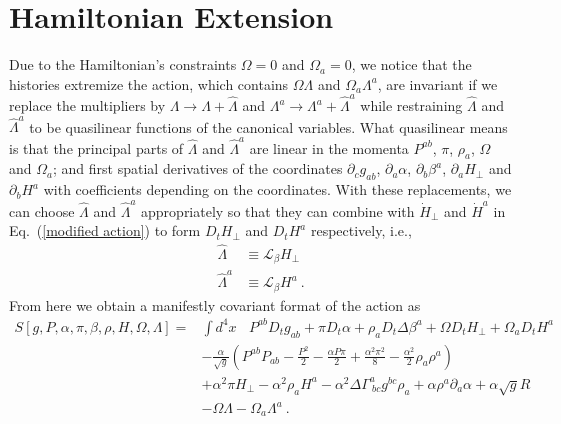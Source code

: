 \section{Hamiltonian Extension}\label{extension}
Due to the Hamiltonian's constraints $\Omega = 0$ and $\Omega_{a} = 0$, we notice that the histories extremize the action, which contains $\Omega \Lambda$ and $\Omega_{a}\Lambda^{a}$, are invariant if we replace the multipliers by $\Lambda \rightarrow \Lambda + {\hat \Lambda}$ and $\Lambda^{a} \rightarrow \Lambda^{a} + {\hat \Lambda}^{a}$ while restraining ${\hat \Lambda}$ and ${\hat \Lambda}^{a}$ to be quasilinear functions of the canonical variables. What quasilinear means is that the principal parts of ${\hat \Lambda}$ and ${\hat \Lambda}^{a}$ are linear in the momenta $P^{ab}$, $\pi$, $\rho_{a}$, $\Omega$ and $\Omega_{a}$; and first spatial derivatives of the coordinates $\partial_{c}g_{ab}$, $\partial_{a}\alpha$, $\partial_{b}\beta^{a}$, $\partial_{a}H_{\perp}$ and $\partial_{b}H^{a}$ with coefficients depending on the coordinates. With these replacements, we can choose ${\hat \Lambda}$ and ${\hat \Lambda}^{a}$ appropriately so that they can combine with ${\dot H}_{\perp}$ and ${\dot H}^{a}$ in Eq.~(\ref{modified action}) to form $D_{t}H_{\perp}$ and $D_{t}H^{a}$ respectively, i.e., 
\begin{subequations}
\begin{align}
{\hat \Lambda} & \equiv \mathcal{L}_{\beta}H_{\perp}\\
{\hat \Lambda}^{a} & \equiv \mathcal{L}_{\beta}H^{a} \ .
\end{align}
\end{subequations}
From here we obtain a manifestly covariant format of the action as
\begin{equation}\label{covariant action}
\begin{split}
S[g, P, \alpha, \pi, \beta, \rho, H, \Omega, \Lambda ] = & \int d^{4}x ~~~~P^{ab}D_{t}g_{ab} + \pi D_{t}\alpha + \rho_{a}D_{t}\Delta \beta^{a} + \Omega D_{t}H_{\perp} + \Omega_{a}D_{t}H^{a}\\
& - \frac{\alpha}{\sqrt{g}}\left(P^{ab}P_{ab} - \frac{P^{2}}{2} - \frac{\alpha P \pi}{2} + \frac{\alpha^{2}\pi^{2}}{8} - \frac{\alpha^{2}}{2}\rho_{a}\rho^{a}\right)\\
& +\alpha^{2}\pi H_{\perp} - \alpha^{2}\rho_{a}H^{a} - \alpha^{2}\Delta\Gamma^{a}_{~bc}g^{bc}\rho_{a} + \alpha \rho^{a}\partial_{a}\alpha + \alpha\sqrt{g}R\\
& - \Omega\Lambda - \Omega_{a}\Lambda^{a} \ .
\end{split}
\end{equation} 


